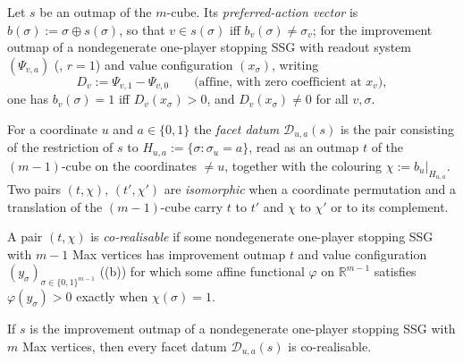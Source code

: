 
\begin{definition}\label{hkc:def-datum}
Let $s$ be an outmap of the $m$-cube. Its \emph{preferred-action vector} is
$b(\sigma):=\sigma\oplus s(\sigma)$, so that $v\in s(\sigma)$ iff
$b_v(\sigma)\ne\sigma_v$; for the improvement outmap of a nondegenerate
one-player stopping SSG with readout system $(\Psi_{v,a})$
(, $r=1$) and value configuration $(x_\sigma)$,
writing
\[
   D_v:=\Psi_{v,1}-\Psi_{v,0}
   \qquad\text{(affine, with zero coefficient at $x_v$)},
\]
one has $b_v(\sigma)=1$ iff $D_v(x_\sigma)>0$, and $D_v(x_\sigma)\ne0$ for all
$v,\sigma$.

For a coordinate $u$ and $a\in\{0,1\}$ the \emph{facet datum}
$\mathcal D_{u,a}(s)$ is the pair consisting of the restriction of $s$ to
$H_{u,a}:=\{\sigma:\sigma_u=a\}$, read as an outmap $t$ of the $(m-1)$-cube on
the coordinates $\ne u$, together with the colouring $\chi:=b_u|_{H_{u,a}}$.
Two pairs $(t,\chi)$, $(t',\chi')$ are \emph{isomorphic} when a coordinate
permutation and a translation of the $(m-1)$-cube carry $t$ to $t'$ and $\chi$
to $\chi'$ or to its complement.

A pair $(t,\chi)$ is \emph{co-realisable} if some nondegenerate one-player
stopping SSG with $m-1$ Max vertices has improvement outmap $t$ and value
configuration $(y_\sigma)_{\sigma\in\{0,1\}^{m-1}}$
((b)) for which some affine functional $\varphi$ on
$\mathbb R^{m-1}$ satisfies $\varphi(y_\sigma)>0$ exactly when
$\chi(\sigma)=1$.
\end{definition}

\begin{lemma}\label{hkc:facet}
If $s$ is the improvement outmap of a nondegenerate one-player stopping SSG
with $m$ Max vertices, then every facet datum $\mathcal D_{u,a}(s)$ is
co-realisable.
\end{lemma}

